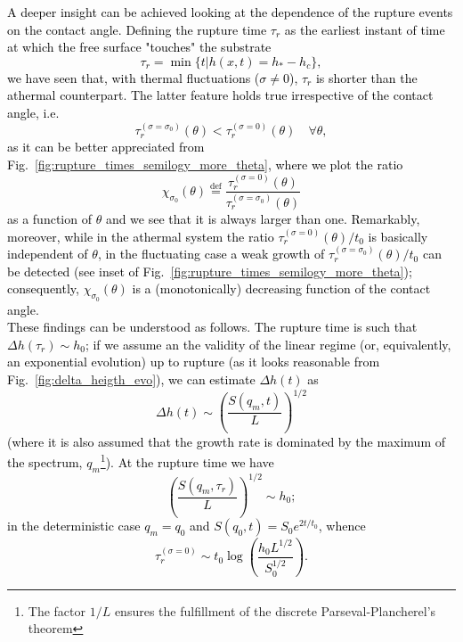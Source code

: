 \textcolor{black}{A deeper insight can be achieved looking at the dependence of the rupture events on the contact angle. Defining the rupture time $\tau_r$ as 
the earliest instant of time at which the free surface "touches" the substrate
$$
\tau_r = \min\{t|h(x,t) = h_{\ast}-h_c\},
$$
we have seen that, with thermal fluctuations ($\sigma \neq 0$), $\tau_r$ is shorter than the athermal counterpart.
The latter feature holds true irrespective of the contact angle, i.e. 
$$
\tau_r^{(\sigma=\sigma_0)}(\theta) < \tau_r^{(\sigma=0)}(\theta) \quad \forall \theta,
$$
as it can be better appreciated from Fig.~\ref{fig:rupture_times_semilogy_more_theta}, where we plot 
the ratio
\begin{equation}\label{eq:defchi}
\chi_{\sigma_0}(\theta) \stackrel{\text{def}}{=} \frac{\tau_r^{(\sigma=0)}(\theta)}{\tau_r^{(\sigma=\sigma_0)}(\theta)}
\end{equation}
as a function of $\theta$ and we see that it is always larger than one. 
Remarkably, moreover, while in the athermal system the ratio $\tau_r^{(\sigma=0)}(\theta)/t_0$ is basically independent of $\theta$, in the fluctuating case
a weak growth of $\tau_r^{(\sigma=\sigma_0)}(\theta)/t_0$ can be detected (see inset of 
Fig.~\ref{fig:rupture_times_semilogy_more_theta});
consequently, $\chi_{\sigma_0}(\theta)$ is a (monotonically) decreasing function of  
the contact angle.\\
These findings can be understood as follows. The rupture time is such that $\Delta h(\tau_r) \sim h_0$; if we assume 
an the validity of the linear regime (or, equivalently, an exponential evolution) up to rupture 
(as it looks reasonable from Fig.~\ref{fig:delta_heigth_evo}), we can estimate $\Delta h(t)$ as 
$$
\Delta h(t) \sim \left(\frac{S(q_m,t)}{L}\right)^{1/2}
$$
(where it is also assumed that the growth rate is dominated by the maximum of the spectrum, $q_m$\footnote{The factor $1/L$ ensures the 
fulfillment of the discrete Parseval-Plancherel's theorem}).
At the rupture time we have
\begin{equation}\label{eq:ruptime}
\left(\frac{S(q_m,\tau_r)}{L}\right)^{1/2} \sim h_0;
\end{equation}
in the deterministic case $q_m=q_0$ and $S(q_0,t) = S_0e^{2t/t_0}$, 
whence
\begin{equation}\label{eq:taur_det}
    \tau_r^{(\sigma=0)} \sim t_0 \log\left(\frac{h_0 L^{1/2}}{S_0^{1/2}}\right).

\end{equation}}

